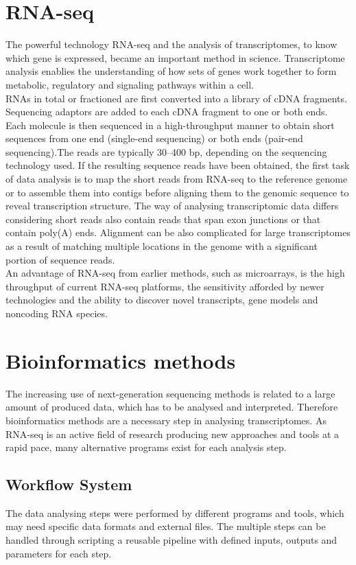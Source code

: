 \documentclass[12pt, a4paper]{report}
\begin{document}
\section{RNA-seq}
The powerful technology RNA-seq and the analysis of transcriptomes, to know which gene is expressed, became an important method in science. Transcriptome analysis enablies the understanding of how sets of genes work together to form metabolic, regulatory and signaling pathways within a cell. \cite{Xiong2006} \\
RNAs in total or fractioned are first converted into a library of cDNA fragments. Sequencing adaptors are added to each cDNA fragment to one or both ends. Each molecule is then sequenced in a high-throughput manner to obtain short sequences from one end (single-end sequencing) or both ends (pair-end sequencing).The reads are typically 30–400 bp, depending on the sequencing technology used. If the resulting sequence reads have been obtained, the first task of data analysis is to map the short reads from RNA-seq to the reference genome or to assemble them into contigs before aligning them to the genomic sequence to reveal transcription structure. The way of analysing transcriptomic data differs considering short reads also contain reads that span exon junctions or that contain poly(A) ends. Alignment can be also complicated for large transcriptomes as a result of matching multiple locations in the genome with a significant portion of sequence reads. \cite{Wang2010} \\
An advantage of RNA-seq from earlier methods, such as microarrays, is the high throughput of current RNA-seq platforms, the sensitivity afforded by newer technologies and the ability to discover novel transcripts, gene models and noncoding RNA species. \cite{Korpelainen2014} \\

\section{Bioinformatics methods}
The increasing use of next-generation sequencing methods is related to a large amount of produced data, which has to be analysed and interpreted. Therefore bioinformatics methods are a necessary step in analysing transcriptomes. As RNA-seq is an active field of research producing new approaches and tools at a rapid pace, many alternative programs exist for each analysis step. \cite{Korpelainen2014}

\subsection{Workflow System}
The data analysing steps were performed by different programs and tools, which may need specific data formats and external files. The multiple steps can be handled through scripting a reusable pipeline with defined inputs, outputs and parameters for each step. 
\end{document}
